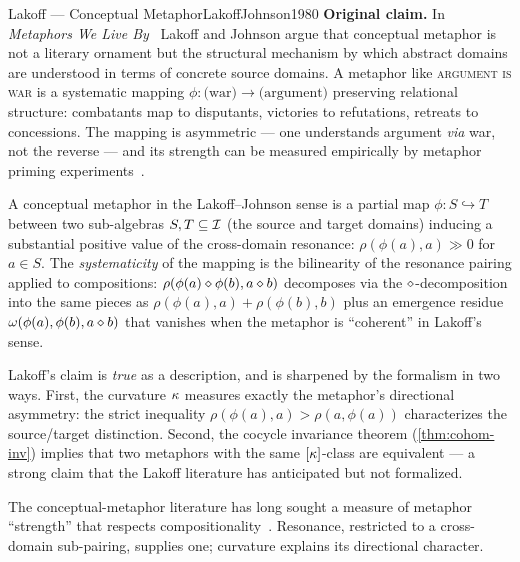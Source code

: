 \begin{zooentry}{Lakoff --- Conceptual Metaphor}{LakoffJohnson1980}
\textbf{Original claim.} In \emph{Metaphors We Live By}~\cite{LakoffJohnson1980}
Lakoff and Johnson argue that conceptual metaphor is not a literary
ornament but the structural mechanism by which abstract domains are
understood in terms of concrete source domains. A metaphor like
\textsc{argument is war} is a systematic mapping
$\phi:\text{(war)}\to\text{(argument)}$ preserving relational structure:
combatants map to disputants, victories to refutations, retreats to
concessions. The mapping is asymmetric --- one understands argument
\emph{via} war, not the reverse --- and its strength can be measured
empirically by metaphor priming
experiments~\cite{LakoffJohnson1980,Fillmore1982}.

\formalclaim
A conceptual metaphor in the Lakoff--Johnson sense is a partial map
$\phi:S\hookrightarrow T$ between two sub-algebras $S,T\subseteq\mathcal{I}$
(the source and target domains) inducing a substantial positive value of
the cross-domain resonance: $\rho(\phi(a),a)\gg 0$ for $a\in S$. The
\emph{systematicity} of the mapping is the bilinearity of the resonance
pairing applied to compositions: $\rho(\phi(a)\mathbin{\diamond}\phi(b),a\mathbin{\diamond} b)$
decomposes via the $\mathbin{\diamond}$-decomposition into the same pieces as
$\rho(\phi(a),a)+\rho(\phi(b),b)$ plus an emergence residue
$\omega(\phi(a),\phi(b),a\mathbin{\diamond} b)$ that vanishes when the metaphor is
``coherent'' in Lakoff's sense.

\formalstatus
Lakoff's claim is \emph{true} as a description, and is sharpened by the
formalism in two ways. First, the curvature $\kappa$ measures exactly the
metaphor's directional asymmetry: the strict inequality
$\rho(\phi(a),a)>\rho(a,\phi(a))$ characterizes the source/target
distinction. Second, the cocycle invariance theorem
(\cref{thm:cohom-inv}) implies that two metaphors with the same
$[\kappa]$-class are equivalent --- a strong claim that the Lakoff
literature has anticipated but not formalized.

\litcomment
The conceptual-metaphor literature has long sought a measure of metaphor
``strength'' that respects compositionality~\cite{FauconnierTurner2002}.
Resonance, restricted to a cross-domain sub-pairing, supplies one;
curvature explains its directional character.
\end{zooentry}

